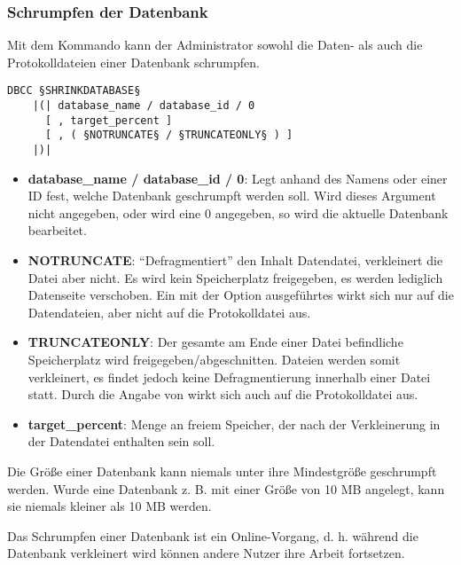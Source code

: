        \subsubsection{Schrumpfen der Datenbank}
          Mit dem Kommando  kann der Administrator
          sowohl die Daten- als auch die Protokolldateien einer Datenbank
          schrumpfen.
          \begin{lstlisting}[language=ebnf, caption={Die Syntax zu
          SHRINKDATABASE}, label=admin03_34]
DBCC §SHRINKDATABASE§
    |(| database_name / database_id / 0 
      [ , target_percent ]
      [ , ( §NOTRUNCATE§ / §TRUNCATEONLY§ ) ]
    |)| 
          \end{lstlisting}
          \begin{itemize}
            \item \textbf{database\_name / database\_id / 0}: Legt anhand des
            Namens oder einer ID fest, welche Datenbank geschrumpft werden soll.
            Wird dieses Argument nicht angegeben, oder wird eine 0 angegeben, so
            wird die aktuelle Datenbank bearbeitet.  
            \item \textbf{NOTRUNCATE}: \enquote{Defragmentiert} den
            Inhalt Datendatei, verkleinert die Datei aber nicht. Es wird
            kein Speicherplatz freigegeben, es werden lediglich Datenseite
            verschoben. Ein mit der Option 
            ausgeführtes  wirkt sich nur
            auf die Datendateien, aber nicht auf die Protokolldatei aus.
            \item \textbf{TRUNCATEONLY}: Der gesamte am Ende einer
            Datei befindliche Speicherplatz wird freigegeben/abgeschnitten.
            Dateien werden somit verkleinert, es findet jedoch keine
            Defragmentierung innerhalb einer Datei statt. Durch die Angabe von
             wirkt sich  auch auf die Protokolldatei aus.
            \item \textbf{target\_percent}: Menge an freiem Speicher, der nach
            der Verkleinerung in der Datendatei enthalten sein soll.
          \end{itemize}
          \begin{merke}
            Die Größe einer Datenbank kann niemals unter ihre Mindestgröße
            geschrumpft werden. Wurde eine Datenbank z. B. mit einer Größe von 10
            MB angelegt, kann sie niemals kleiner als 10 MB werden.
          \end{merke}
          Das Schrumpfen einer Datenbank ist ein Online-Vorgang, d. h. während die
          Datenbank verkleinert wird können andere Nutzer ihre Arbeit fortsetzen.
          
